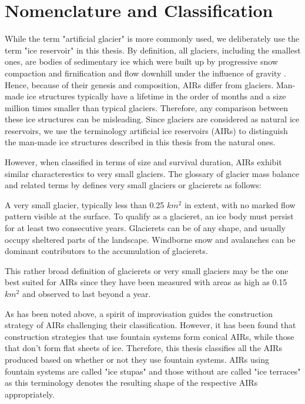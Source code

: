 \section{Nomenclature and Classification}

While the term "artificial glacier" is more commonly used, we deliberately use the term "ice reservoir" in this
thesis. By definition, all glaciers, including the smallest ones, are bodies of sedimentary ice which were built
up by progressive snow compaction and firnification and flow downhill under the influence of gravity
\citep{benndouglasiGlaciersGlaciation2014}. Hence, because of their genesis and composition, AIRs differ from
glaciers. Man-made ice structures typically have a lifetime in the order of months and a size million times
smaller than typical glaciers. Therefore, any comparison between these ice structures can be misleading. Since
glaciers are considered as natural ice reservoirs, we use the terminology artificial ice reservoirs (AIRs) to
distinguish the man-made ice structures described in this thesis from the natural ones. 


However, when classified in terms of size and survival duration, AIRs exhibit similar characterestics to
very small glaciers. The glossary of glacier mass balance and related terms by
\citet{cogleyGlossaryGlacierMass2010} defines very small glaciers or glacierets as follows:

\begin{thesis_quotation}
  A very small glacier, typically less than 0.25 $km^2$ in extent, with no marked flow pattern
  visible at the surface. To qualify as a glacieret, an ice body must persist for at least two consecutive
  years. Glacierets can be of any shape, and usually occupy sheltered parts of the landscape. Windborne snow and
  avalanches can be dominant contributors to the accumulation of glacierets.
\end{thesis_quotation}

This rather broad definition of glacierets or very small glaciers may be the one best suited for AIRs since
they have been measured with areas as high as 0.15 $km^2$ and observed to last beyond a year.

As has been noted above, a spirit of improvisation guides the construction strategy of AIRs challenging their
classification. However, it has been found that construction strategies that use fountain systems form conical
AIRs, while those that don't form flat sheets of ice. Therefore, this thesis classifies all the AIRs produced
based on whether or not they use fountain systems. AIRs using fountain systems are called "ice stupas" and those
without are called "ice terraces" as this terminology denotes the resulting shape of the respective AIRs
appropriately.

